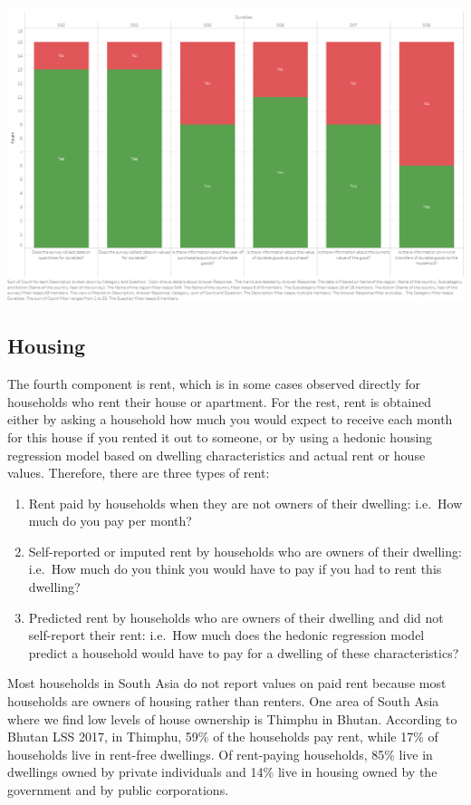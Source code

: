 \documentclass[13 pt,]{book}
\providecommand{\tightlist}{%
  \setlength{\itemsep}{0pt}\setlength{\parskip}{0pt}}
\begin{document}
\href{https://tab.worldbank.org/\#/site/WBG/views/SAR_MNA_Metadata/Durables}{\includegraphics{figures/Durables.png}}

\subsection{Housing}\label{housing}

The fourth component is rent, which is in some cases observed directly
for households who rent their house or apartment. For the rest, rent is
obtained either by asking a household how much you would expect to
receive each month for this house if you rented it out to someone, or by
using a hedonic housing regression model based on dwelling
characteristics and actual rent or house values. Therefore, there are
three types of rent:

\begin{enumerate}
\def\labelenumi{\arabic{enumi}.}
\tightlist
\item
  Rent paid by households when they are not owners of their dwelling:
  i.e.~How much do you pay per month?
\item
  Self-reported or imputed rent by households who are owners of their
  dwelling: i.e.~How much do you think you would have to pay if you had
  to rent this dwelling?
\item
  Predicted rent by households who are owners of their dwelling and did
  not self-report their rent: i.e.~How much does the hedonic regression
  model predict a household would have to pay for a dwelling of these
  characteristics?
\end{enumerate}

Most households in South Asia do not report values on paid rent because
most households are owners of housing rather than renters. One area of
South Asia where we find low levels of house ownership is Thimphu in
Bhutan. According to Bhutan LSS 2017, in Thimphu, 59\% of the households
pay rent, while 17\% of households live in rent-free dwellings. Of
rent-paying households, 85\% live in dwellings owned by private
individuals and 14\% live in housing owned by the government and by
public corporations.
\end{document}
